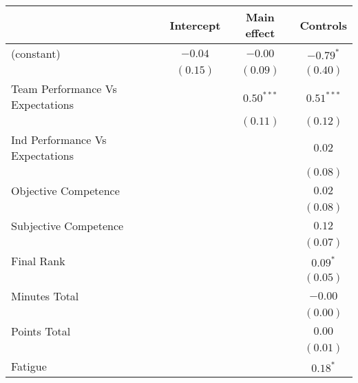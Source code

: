 
\begin{table}
\begin{center}
\begin{tabular}{l c c c }
\toprule
 & Intercept & Main effect & Controls \\
\midrule
(constant)                                 & $-0.04$  & $-0.00$               & $\mathbf{-0.79}^{*}$  \\
                                           & $(0.15)$ & $(0.09)$              & $(0.40)$              \\
Team Performance Vs Expectations           &          & $\mathbf{0.50}^{***}$ & $\mathbf{0.51}^{***}$ \\
                                           &          & $(0.11)$              & $(0.12)$              \\
Ind Performance Vs Expectations            &          &                       & $0.02$                \\
                                           &          &                       & $(0.08)$              \\
Objective Competence                       &          &                       & $0.02$                \\
                                           &          &                       & $(0.08)$              \\
Subjective Competence                      &          &                       & $0.12$                \\
                                           &          &                       & $(0.07)$              \\
Final Rank                                 &          &                       & $\mathbf{0.09}^{*}$   \\
                                           &          &                       & $(0.05)$              \\
Minutes Total                              &          &                       & $-0.00$               \\
                                           &          &                       & $(0.00)$              \\
Points Total                               &          &                       & $0.00$                \\
                                           &          &                       & $(0.01)$              \\
Fatigue                                    &          &                       & $\mathbf{0.18}^{*}$   \\

\end{tabular}
\end{center}
\end{table}
